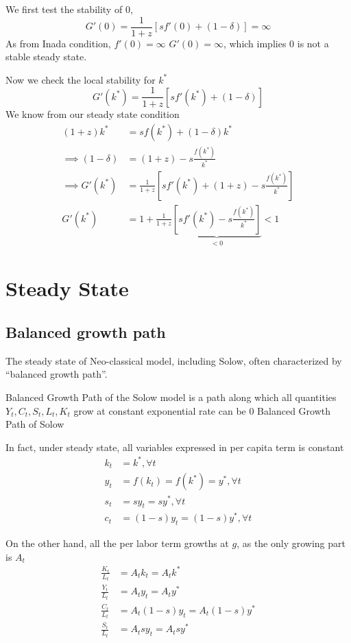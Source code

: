 \documentclass[twocolumn, fleqn]{article}
\begin{document}
			We first test the stability of $0$,
			\[G'(0) = \frac{1}{1+z}[sf'(0)+(1-\delta)] = \infty\]
			As from Inada condition, $f'(0) = \infty$ $G'(0)=\infty$, which implies $0$ is not a stable steady
			state.

			Now we check the local stability for $k^\ast$
			\[G'(k^\ast) = \frac{1}{1+z}[s f'(k^\ast)+(1-\delta)]\]
			We know from our steady state condition
			\begin{align*}
			(1+z)k^{\ast} &= s f(k^\ast) + (1-\delta)k^{\ast}\\
			\implies (1-\delta) &= (1+z) - s \frac{f(k^\ast)}{k^\ast}\\
			\implies G'(k^\ast) &= \frac{1}{1+z}\left[s f'(k^\ast)+(1+z) - s \frac{f(k^\ast)}{k^\ast}\right]\\[4pt]
			G'(k^\ast) &= 1+\frac{1}{1+z}\underbrace{\left[s f'(k^\ast) - s \frac{f(k^\ast)}{k^\ast}\right]}_{<0}<1
			\end{align*}

	\section{Steady State}
		\subsection{Balanced growth path}
			The steady state of Neo-classical model, including Solow, often characterized by ``balanced growth
			path''.

			Balanced Growth Path of the Solow model is a path along which all quantities
				${Y_t, C_t, S_t, L_t, K_t}$ grow at constant exponential rate can be 0 Balanced Growth Path of Solow

			In fact, under steady state, all variables expressed in per capita term is constant
			\begin{align*}
				k_t &= k^{\ast}, \forall t\\
				y_t &= f(k_t) = f(k^\ast)=y^{\ast}, \forall t\\
				s_t &= sy_t = sy^{\ast}, \forall t\\
				c_t &= (1-s)y_t = (1-s)y^{\ast}, \forall t
			\end{align*}

			On the other hand, all the per labor term growths at $g$, as the only growing part is $A_t$
			\begin{align*}
				\frac{K_t}{L_t} &= A_t k_t = A_t k^{\ast}\\
				\frac{Y_t}{L_t} &= A_t y_t = A_t y^{\ast}\\
				\frac{C_t}{L_t} &= A_t (1-s)y_t = A_t (1-s)y^{\ast}\\
				\frac{S_t}{L_t} &= A_t sy_t = A_t s y^{\ast}
			\end{align*}
\end{document}
